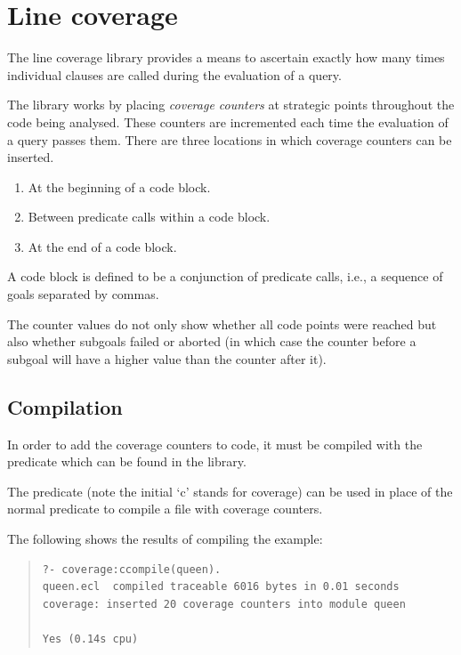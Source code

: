 \section{Line coverage}
The line coverage library provides a means to ascertain exactly how
many times individual clauses are called during the evaluation of a
query.

The library works by placing \emph{coverage counters} at strategic
points throughout the code being analysed.  These counters are
incremented each time the evaluation of a query passes them.  There
are three locations in which coverage counters can be inserted.
\begin{enumerate}
\item At the beginning of a code block.
\item Between predicate calls within a code block.
\item At the end of a code block.
\end{enumerate}
A code block is defined to be a conjunction of predicate calls, i.e., a
sequence of goals separated by commas.

The counter values do not only show whether all code points were
reached but also whether subgoals failed or aborted (in which case
the counter before a subgoal will have a higher value than the
counter after it).

\subsection{Compilation}
In order to add the coverage counters to code, it must be compiled with
the 
predicate which can be found in the
 library.

The  predicate (note the initial `c' stands for
coverage) can be used in place of the normal 
predicate to compile a file with coverage counters.

The following shows the results of compiling the  example:
\begin{quote}
\begin{verbatim}
?- coverage:ccompile(queen).
queen.ecl  compiled traceable 6016 bytes in 0.01 seconds
coverage: inserted 20 coverage counters into module queen

Yes (0.14s cpu)
\end{verbatim}
\end{quote}

